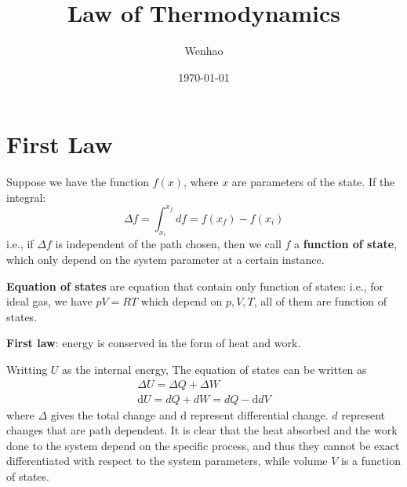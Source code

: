 \documentclass{article}
\newcommand{\dbar}{d}
\newcommand{\dnor}{\text{d}}
\begin{document}
\title{Law of Thermodynamics}
\author{Wenhao}
\date{\today}
\maketitle

\section{First Law}
Suppose we have the function $f(x)$, where $x$ are parameters of the state. 
If the integral:
\begin{equation}
    \Delta f = \int_{x_i}^{x_f} df = f(x_f) - f(x_i) 
\end{equation}
i.e., if $\Delta f$ is independent of the path chosen, then we call $f$ a 
\textbf{function of state}, which only depend on the system parameter at a 
certain instance.

\textbf{Equation of states} are equation that contain only function of states:
i.e., for ideal gas, we have $pV = RT$ which depend on $p, V, T$, all of them are 
function of states.

\textbf{First law}: energy is conserved in the form of heat and work.

Writting $U$ as the internal energy, The equation of states can be written as
\begin{gather}
    \Delta U = \Delta Q + \Delta W \\
    \dnor U = \dbar Q + \dbar W = \dbar Q - \dnor dV
\end{gather}
where $\Delta$ gives the total change and $\dnor$ represent differential change. $\dbar$
represent changes that are path dependent. It is clear that 
the heat absorbed and the work done to the system depend on the specific process, and 
thus they cannot be exact differentiated with respect to the system parameters, while 
volume $V$ is a function of states.
\end{document}
